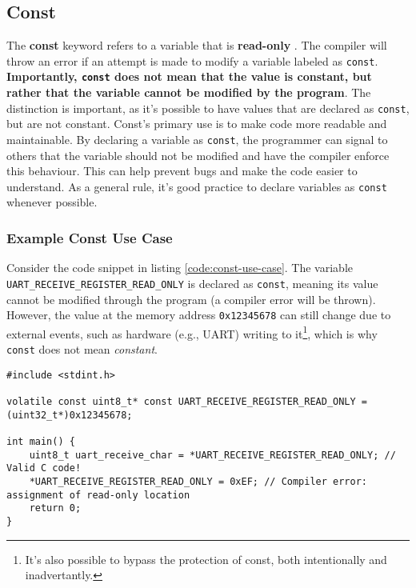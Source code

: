 \documentclass[main.tex]{subfiles}
\begin{document}
\subsection{Const}
The \textbf{const} keyword refers to a variable that is \textbf{read-only} \cite{beningoConst}. The compiler will throw an error if an attempt is made to modify a variable labeled as \texttt{const}. \textbf{Importantly, \texttt{const} does not mean that the value is constant, but rather that the variable cannot be modified by the program}. The distinction is important, as it's possible to have values that are declared as \texttt{const}, but are not constant. 
\newline
\newline
\noindent Const's primary use is to make code more readable and maintainable. By declaring a variable as \texttt{const}, the programmer can signal to others that the variable should not be modified and have the compiler enforce this behaviour. This can help prevent bugs and make the code easier to understand. As a general rule, it's good practice to declare variables as \texttt{const} whenever possible.

\subsubsection{Example Const Use Case}
Consider the code snippet in listing \ref{code:const-use-case}. The variable \texttt{UART\_RECEIVE\_REGISTER\_READ\_ONLY} is declared as \texttt{const}, meaning its value cannot be modified through the program (a compiler error will be thrown). However, the value at the memory address \texttt{0x12345678} can still change due to external events, such as hardware (e.g., UART) writing to it\footnote{It's also possible to bypass the protection of const, both intentionally and inadvertantly.}, which is why \texttt{const} does not mean \textit{constant}.

\begin{lstlisting}[caption={Example use case of Const}, label={code:const-use-case}]
#include <stdint.h>

volatile const uint8_t* const UART_RECEIVE_REGISTER_READ_ONLY = (uint32_t*)0x12345678;

int main() {
    uint8_t uart_receive_char = *UART_RECEIVE_REGISTER_READ_ONLY; // Valid C code!
    *UART_RECEIVE_REGISTER_READ_ONLY = 0xEF; // Compiler error: assignment of read-only location
    return 0;
}
\end{lstlisting}
\end{document}

